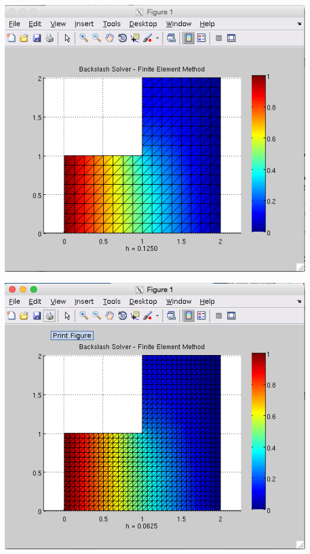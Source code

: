 \documentclass[11pt, oneside]{article}   	%
\begin{document}
\vspace{5mm}

\centerline{\includegraphics[scale = 0.55]{Backslash_h3.png}}

\vspace{5mm}

\centerline{\includegraphics[scale = 0.55]{Backslash_h4.png}}

\vspace{5mm}
\end{document}
